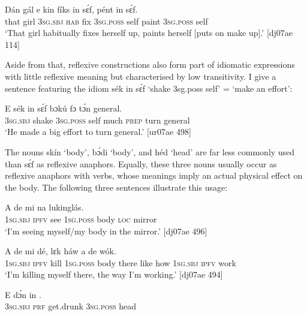 \ea%
    \label{ex:key:1224}
    \gll Dán    gál    e    kin  fíks  in    sɛ́f,    pént    in    sɛ́f.\\
that    girl    \textsc{3sg.sbj}  \textsc{hab}  fix  \textsc{3sg.poss}  self    paint  \textsc{3sg.poss}  self\\

\glt ‘That girl habitually fixes herself up, paints herself [puts on make up].’ [dj07ae 114]
\z

Aside from that, reflexive constructions also form part of idiomatic expressions with little reflexive meaning but characterised by low transitivity. I give a sentence featuring the idiom sék in sɛ́f ‘shake 3sg.poss self’ = ‘make an effort’: 


\ea%
    \label{ex:key:1225}
    \gll E    sék    in    sɛ́f  bɔkú  fɔ  tɔ́n    general.\\
\textsc{3sg.sbj}  shake  \textsc{3sg.poss}  self  much  \textsc{prep}  turn    general\\

\glt ‘He made a big effort to turn general.’ [ur07ae 498]
\z

The nouns skín ‘body’, bɔ́di ‘body’, and héd ‘head’ are far less commonly used than sɛ́f as reflexive anaphors. Equally, these three nouns usually occur as reflexive anaphors with verbs, whose meanings imply an actual physical effect on the body. The following three sentences illustrate this usage: 


\ea%
    \label{ex:key:1226}
    \gll \MakeUppercase{A}   de    mi        na  lukinglás.\\
\textsc{1sg.sbj}  \textsc{ipfv}  see  \textsc{1sg.poss}  body  \textsc{loc}  mirror\\

\glt ‘I’m seeing myself/my body in the mirror.’ [dj07ae 496]
\z


\ea%
    \label{ex:key:1227}
    \gll \MakeUppercase{A}   de    mi        dé,    lɛk  háw    a    de  wók.\\
\textsc{1sg.sbj}  \textsc{ipfv}  kill  \textsc{1sg.poss}  body  there  like  how    \textsc{1sg.sbj}  \textsc{ipfv}  work\\

\glt ‘I’m killing myself there, the way I’m working.’ [dj07ae 494]
\z


\ea%
    \label{ex:key:1228}
    \gll E    dɔ́n      in    .\\
\textsc{3sg.sbj}  \textsc{prf}  get.drunk  \textsc{3sg.poss}  head\\

